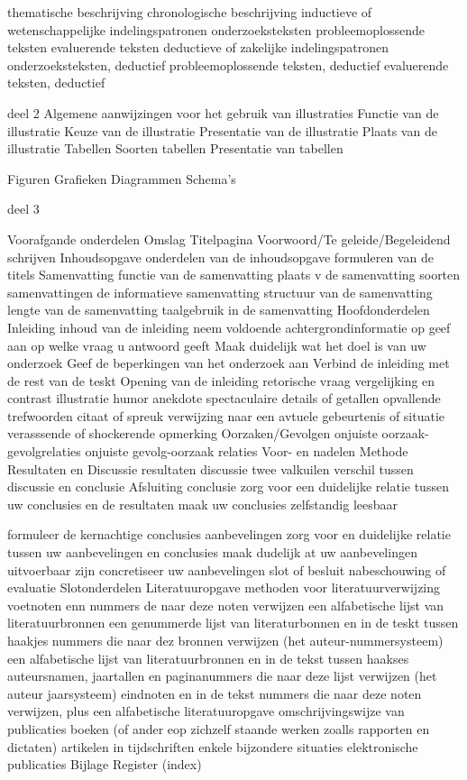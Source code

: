 thematische beschrijving
chronologische beschrijving
inductieve of wetenschappelijke indelingspatronen
onderzoeksteksten
probleemoplossende teksten
evaluerende teksten
deductieve of zakelijke indelingspatronen
onderzoeksteksten, deductief
probleemoplossende teksten, deductief
evaluerende teksten, deductief

deel 2
Algemene aanwijzingen voor het gebruik van illustraties
Functie van de illustratie
Keuze van de illustratie
Presentatie van de illustratie
Plaats van de illustratie
Tabellen
Soorten tabellen
Presentatie van tabellen

Figuren
Grafieken
Diagrammen
Schema's


deel 3

Voorafgande onderdelen
Omslag
Titelpagina
Voorwoord/Te geleide/Begeleidend schrijven
Inhoudsopgave
onderdelen van de inhoudsopgave
formuleren van de titels
Samenvatting
functie van de samenvatting
plaats v de samenvatting
soorten samenvattingen
de informatieve samenvatting
structuur van de samenvatting
lengte van de samenvatting
taalgebruik in de samenvatting
Hoofdonderdelen
Inleiding
inhoud van de inleiding
neem voldoende achtergrondinformatie op
geef aan op welke vraag u antwoord geeft
Maak duidelijk wat het doel is van uw onderzoek
Geef de beperkingen van het onderzoek aan
Verbind de inleiding met de rest van de teskt
Opening van de inleiding
retorische vraag
vergelijking en contrast
illustratie
humor
anekdote
spectaculaire details of getallen
opvallende trefwoorden
citaat of spreuk
verwijzing naar een avtuele gebeurtenis of situatie
verasssende of shockerende opmerking
Oorzaken/Gevolgen
onjuiste oorzaak-gevolgrelaties
onjuiste gevolg-oorzaak relaties
Voor- en nadelen
Methode
Resultaten en Discussie
resultaten
discussie
twee valkuilen
verschil tussen discussie en conclusie
Afsluiting
conclusie
zorg voor een duidelijke relatie tussen uw conclusies en de resultaten
maak uw conclusies zelfstandig leesbaar

formuleer de kernachtige conclusies
aanbevelingen
zorg voor en duidelijke relatie tussen uw aanbevelingen en conclusies
maak dudelijk at uw aanbevelingen uitvoerbaar zijn
concretiseer uw aanbevelingen
slot of besluit
nabeschouwing of evaluatie
Slotonderdelen
Literatuuropgave
methoden voor literatuurverwijzing
voetnoten enn nummers de naar deze noten verwijzen
een alfabetische lijst van literatuurbronnen
een genummerde lijst van literaturbonnen en in de teskt tussen haakjes nummers die naar dez bronnen verwijzen (het auteur-nummersysteem)
een alfabetische lijst van literatuurbronnen en in de tekst tussen haakses auteursnamen, jaartallen en paginanummers die naar deze lijst verwijzen (het auteur jaarsysteem)
eindnoten en in de tekst nummers die naar deze noten verwijzen, plus een alfabetische literatuuropgave
omschrijvingswijze van publicaties
boeken (of ander eop zichzelf staande werken zoalls rapporten en dictaten)
artikelen in tijdschriften
enkele bijzondere situaties
elektronische publicaties
Bijlage
Register (index)

